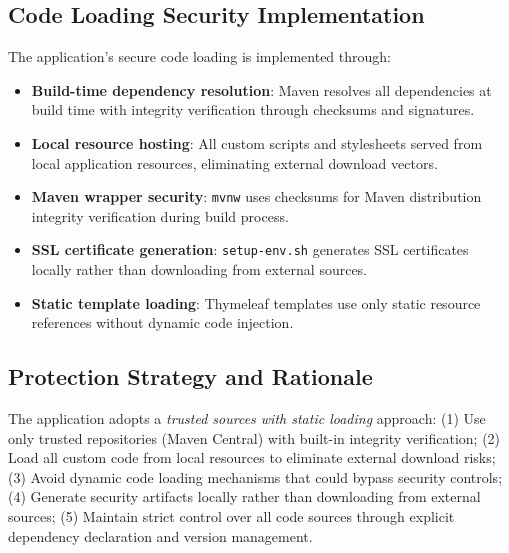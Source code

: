\documentclass[]{UCD_CS_FYP_Report}
\begin{document}
\subsection{Code Loading Security Implementation}
The application's secure code loading is implemented through:
\begin{itemize}
	\item \textbf{Build-time dependency resolution}: Maven resolves all dependencies at build time with integrity verification through checksums and signatures.
	\item \textbf{Local resource hosting}: All custom scripts and stylesheets served from local application resources, eliminating external download vectors.
	\item \textbf{Maven wrapper security}: \texttt{mvnw} uses checksums for Maven distribution integrity verification during build process.
	\item \textbf{SSL certificate generation}: \texttt{setup-env.sh} generates SSL certificates locally rather than downloading from external sources.
	\item \textbf{Static template loading}: Thymeleaf templates use only static resource references without dynamic code injection.
\end{itemize}

\subsection{Protection Strategy and Rationale}
The application adopts a \textit{trusted sources with static loading} approach: (1) Use only trusted repositories (Maven Central) with built-in integrity verification; (2) Load all custom code from local resources to eliminate external download risks; (3) Avoid dynamic code loading mechanisms that could bypass security controls; (4) Generate security artifacts locally rather than downloading from external sources; (5) Maintain strict control over all code sources through explicit dependency declaration and version management.
\end{document}
